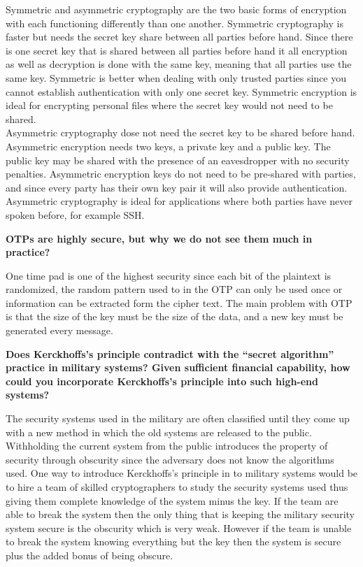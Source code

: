 \documentclass[letterpaper,11pt,notitlepage,fleqn]{article}
\begin{document}
Symmetric and asymmetric cryptography are the two basic forms of encryption with each functioning differently than one another. Symmetric cryptography is faster but needs the secret key share between all parties before hand. Since there is one secret key that is shared between all parties before hand it all encryption as well as decryption is done with the same key, meaning that all parties use the same key. Symmetric is better when dealing with only trusted parties since you cannot
establish authentication with only one secret key. Symmetric encryption is ideal for encrypting personal files where the secret key would not need to be shared.\\
\indent Asymmetric cryptography dose not need the secret key to be shared before hand. Asymmetric encryption needs two keys, a private key and a public key. The public key may be shared with the presence of an eavesdropper with no security penalties. Asymmetric encryption keys do not need to be pre-shared with parties, and since every party has their own key pair it will also provide authentication. Asymmetric cryptography is ideal for applications where both parties have never spoken before, for example SSH. 

\noindent \textbf{OTPs are highly secure, but why we do not see them much in practice?}


One time pad is one of the highest security since each bit of the plaintext is randomized, the random pattern used to in the OTP can only be used once or information can be extracted form the cipher text. The main problem with OTP is that the size of the key must be the size of the data, and a new key must be generated every message. 

\noindent \textbf{Does Kerckhoffs's principle contradict with the ``secret algorithm'' practice in military systems? Given sufficient financial capability, how could you incorporate Kerckhoffs's principle into such high-end systems?}

The security systems used in the military are often classified until they come up with a new method in which the old systems are released to the public. Withholding the current system from the public introduces the property of security through obscurity since the adversary does not know the algorithms used. One way to introduce Kerckhoffs's principle in to military systems would be to hire a team of skilled cryptographers to study the security systems used thus giving them complete knowledge
of the system minus the key. If the team are able to break the system then the only thing that is keeping the military security system secure is the obscurity which is very weak. However if the team is unable to break the system knowing everything but the key then the system is secure plus the added bonus of being obscure.
\end{document}
